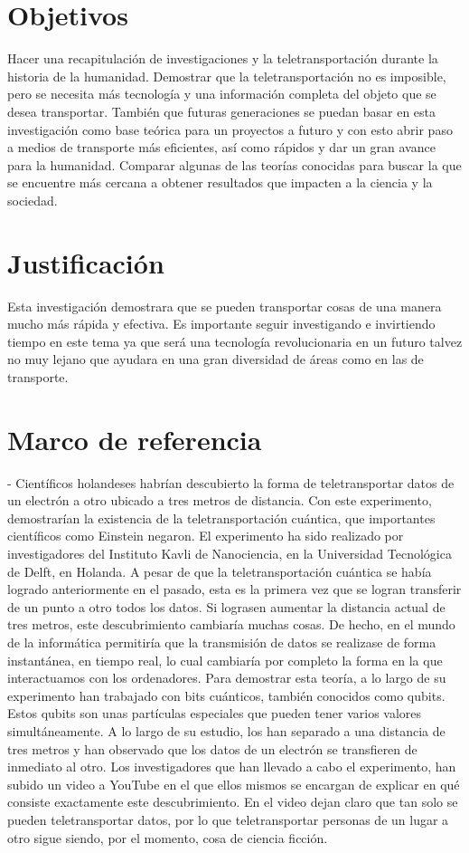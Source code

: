 \documentclass{bmcart}
\begin{document}
\section*{Objetivos}
Hacer una recapitulación de investigaciones y la teletransportación durante la historia de la humanidad.
Demostrar que la teletransportación no es imposible, pero se necesita más tecnología y una información completa del objeto que se desea transportar. 
También que futuras generaciones se puedan basar en esta investigación como base teórica para un proyectos a futuro y con esto abrir paso a medios de transporte más eficientes, así como rápidos y dar un gran avance para la humanidad.
Comparar algunas de las teorías conocidas para buscar la que se encuentre más cercana a obtener resultados que impacten a la ciencia y la sociedad.

\section*{Justificación}
Esta investigación demostrara que se pueden transportar cosas de una manera mucho más rápida y efectiva. Es importante seguir investigando e invirtiendo tiempo en este tema ya que será una tecnología revolucionaria en un futuro talvez no muy lejano que ayudara en una gran diversidad de áreas como en las de transporte.
\section*{Marco de referencia}
-	Científicos holandeses habrían descubierto la forma de teletransportar datos de un electrón a otro ubicado a tres metros de distancia. Con este experimento, demostrarían la existencia de la teletransportación cuántica, que importantes científicos como Einstein negaron. 
El experimento ha sido realizado por investigadores del Instituto Kavli de Nanociencia, en la Universidad Tecnológica de Delft, en Holanda. A pesar de que la teletransportación cuántica se había logrado anteriormente en el pasado, esta es la primera vez que se logran transferir de un punto a otro todos los datos. 
Si lograsen aumentar la distancia actual de tres metros, este descubrimiento cambiaría muchas cosas. De hecho, en el mundo de la informática permitiría que la transmisión de datos se realizase de forma instantánea, en tiempo real, lo cual cambiaría por completo la forma en la que interactuamos con los ordenadores. Para demostrar esta teoría, a lo largo de su experimento han trabajado con bits cuánticos, también conocidos como qubits. 
Estos qubits son unas partículas especiales que pueden tener varios valores simultáneamente. A lo largo de su estudio, los han separado a una distancia de tres metros y han observado que los datos de un electrón se transfieren de inmediato al otro. Los investigadores que han llevado a cabo el experimento, han subido un video a YouTube en el que ellos mismos se encargan de explicar en qué consiste exactamente este descubrimiento. 
En el video dejan claro que tan solo se pueden teletransportar datos, por lo que teletransportar personas de un lugar a otro sigue siendo, por el momento, cosa de ciencia ficción.
\end{document}
